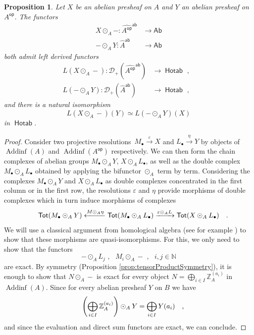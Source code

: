 \documentclass[10pt, english, a4paper, nothms]{amsart}
\theoremstyle{plain}
\newtheorem{prop}[theorem]{Proposition}
\theoremstyle{remark}
\theoremstyle{definition}
\numberwithin{equation}{theorem}
\newcommand\Z{\mathbb{Z}}
\newcommand\N{\mathbb{N}}
\DeclareMathOperator{\op}{\mathsf{op}}
\newcommand{\Hotab}{\operatorname{\mathsf{Hotab}}}
\newcommand{\Ab}{{\mathsf{Ab}}}
\newcommand{\Tot}{\operatorname{\mathsf{Tot}}}
\newcommand{\Addinf}{\operatorname{\mathrm{Addinf}}}
\newcommand{\Wh}[2]{\Z_{#1}^{\left(#2\right)}}
\newcommand{\prefab}[1]{\widehat{ #1 }^{\mathsf{ab}}}
\let\epsilon\varepsilon
\newcommand{\mdvirg}{\text{ ,}\hspace{10pt}}
\newcommand\zbox[1]{\makebox[0pt][l]{#1}}
\newcommand\pbox[1]{\zbox{\quad #1}} %
\begin{document}
\begin{prop}\label{produittensorielderive}
Let $X$ be an abelian presheaf on $A$ and $Y$ an abelian presheaf on
${A}^{\op}$. The functors
\begin{align*}
X \odot_A -: \prefab{{A}^{\op}} &\to \Ab  \\
- \odot_A Y: \prefab{A} &\to \Ab
\end{align*}
both admit left derived functors
\begin{align*}
L(X \odot_A -): \mathcal{D}_+(\prefab{{A}^{\op}}) &\to \Hotab \mdvirg \\
L(- \odot_A Y): \mathcal{D}_+(\prefab{A}) &\to \Hotab \mdvirg
\end{align*}
and there is a natural isomorphism
\[
L(X \odot_A -)(Y) \simeq L(- \odot_A Y)(X) 
\]
in $\Hotab$.
\end{prop}
\begin{proof}
Consider two projective resolutions~$M_{\bullet}\xrightarrow{\epsilon} X$ and
$L_{\bullet} \xrightarrow{\eta} Y$ by objects of $\Addinf(A)$ and
$\Addinf({A}^{\op})$ respectively. 
We can then form the chain complexes of abelian groups $M_{\bullet}\odot_A Y$,
$X\odot_A L_{\bullet}$, as well as the double complex~$M_{\bullet}\odot_A
L_{\bullet}$ obtained by applying the bifunctor $\odot_A$ term by term.
Considering the complexes $M_{\bullet}\odot_A Y$ and $X\odot_A L_{\bullet}$
as double complexes concentrated in the first column or in the
first row, the resolutions $\epsilon$ and $\eta$ provide morphisms of
double complexes which in turn induce morphisms of complexes 
\[
\Tot (M_\bullet \odot_A Y) \xleftarrow{M \odot_A \eta} \Tot(M_\bullet
\odot_A L_\bullet)
\xrightarrow{\epsilon\odot_A L} \Tot(X \odot_A L_\bullet) \pbox{.}
\]
We will use a classical argument from homological algebra (see for example
\cite[2.7]{weibel1994Introduction}) to show that these morphisms are
quasi-isomorphisms. For this, we only need to show that the functors 
\[
- \odot_A L_j \mdvirg M_i \odot_A - \mdvirg i,j\in \N
\]
are exact. By symmetry (Proposition \ref{prop:tensorProductSymmetry}), it is
enough to show that $N \odot_A -$ is exact for every
object $N=\bigoplus_{i\in I}\Wh{A}{a_i}$ in $\Addinf(A)$. Since for every
abelian presheaf $Y$ on $B$ we have
\[
\left(\bigoplus_{i\in I}\Wh{A}{a_i}\right)\odot_A Y = \bigoplus_{i\in I}Y(a_i) 
\pbox{,}
\]
and since the evaluation and direct sum functors are exact, we can conclude.
\end{proof}
\end{document}
